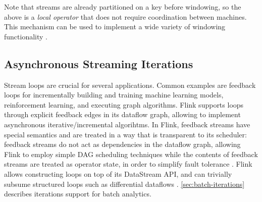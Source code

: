 Note that streams are already partitioned on a key before windowing, so the above is a \textit{local operator} that does not require coordination between machines. This mechanism can be used to implement a wide variety of windowing functionality \cite{akidau2015dataflow}. 

\subsection{Asynchronous Streaming Iterations}
Stream loops are crucial for several applications. Common examples are feedback loops for incrementally building and training machine learning models, reinforcement learning, and executing graph algorithms. Flink supports loops through explicit feedback edges in its dataflow graph, allowing to implement asynchronous iterative/incremental algorihtms. In Flink, feedback streams have special semantics and are treated in a way that is transparent to its scheduler: feedback streams do not act as dependencies in the dataflow graph, allowing Flink to employ simple DAG scheduling techniques while the contents of feedback streams are treated as operator state, in order to simplify fault tolerance \cite{carbone2015lightweight}. Flink allows constructing loops on top of its DataStream API, and can trivially subsume structured loops such as differential dataflows \cite{murray2013naiad}. \autoref{sec:batch-iterations} describes iterations support for batch analytics.
